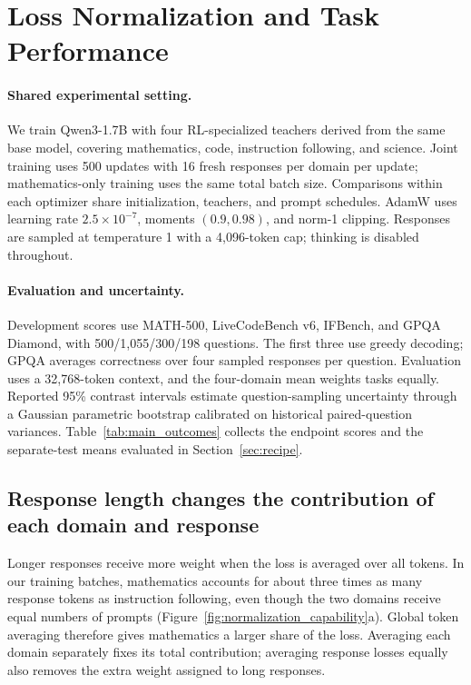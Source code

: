 \section{Loss Normalization and Task Performance}
\label{sec:normalization}

\paragraph{Shared experimental setting.}
We train Qwen3-1.7B with four RL-specialized teachers derived from the same base model, covering mathematics, code, instruction following, and science. Joint training uses 500 updates with 16 fresh responses per domain per update; mathematics-only training uses the same total batch size. Comparisons within each optimizer share initialization, teachers, and prompt schedules. AdamW uses learning rate $2.5\times10^{-7}$, moments $(0.9,0.98)$, and norm-1 clipping. Responses are sampled at temperature 1 with a 4,096-token cap; thinking is disabled throughout.

\paragraph{Evaluation and uncertainty.}
Development scores use MATH-500, LiveCodeBench v6, IFBench, and GPQA Diamond, with 500/1,055/300/198 questions. The first three use greedy decoding; GPQA averages correctness over four sampled responses per question. Evaluation uses a 32,768-token context, and the four-domain mean weights tasks equally. Reported 95\% contrast intervals estimate question-sampling uncertainty through a Gaussian parametric bootstrap calibrated on historical paired-question variances. Table~\ref{tab:main_outcomes} collects the endpoint scores and the separate-test means evaluated in Section~\ref{sec:recipe}.



\subsection{Response length changes the contribution of each domain and response}

Longer responses receive more weight when the loss is averaged over all tokens. In our training batches, mathematics accounts for about three times as many response tokens as instruction following, even though the two domains receive equal numbers of prompts (Figure~\ref{fig:normalization_capability}a). Global token averaging therefore gives mathematics a larger share of the loss. Averaging each domain separately fixes its total contribution; averaging response losses equally also removes the extra weight assigned to long responses.

